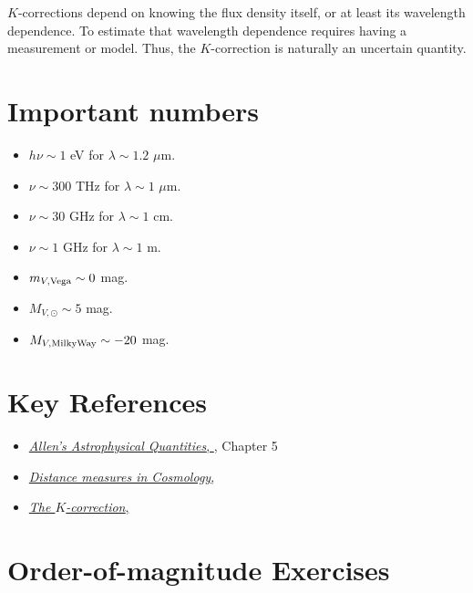 $K$-corrections depend on knowing the flux density itself, or at least
its wavelength dependence. To estimate that wavelength dependence
requires having a measurement or model. Thus, the $K$-correction is
naturally an uncertain quantity.

\section{Important numbers}

\begin{itemize}
\item $h\nu \sim 1$ eV for $\lambda \sim 1.2$ $\mu$m.
\item $\nu \sim 300$ THz for $\lambda \sim 1$ $\mu$m.
\item $\nu \sim 30$ GHz for $\lambda \sim 1$ cm.
\item $\nu \sim 1$ GHz for $\lambda \sim 1$ m.
\item $m_{V, {\rm Vega}} \sim 0$ mag.
\item $M_{V, \odot} \sim 5$ mag.
\item $M_{V, {\rm Milky Way}} \sim -20$ mag.
\end{itemize}

\section{Key References}

\begin{itemize}
  \item
    \href{http://adsabs.harvard.edu/abs/2000asqu.book.....C}{
    {\it Allen's Astrophysical Quantities},
      \citet{cox00a}}, Chapter 5
  \item
    \href{http://adsabs.harvard.edu/abs/1999astro.ph..5116H}{
    {\it Distance measures in Cosmology},
      \citet{hogg99cosm}}
  \item
    \href{http://adsabs.harvard.edu/abs/2002astro.ph.10394H}{
    {\it The $K$-correction},
      \citet{hogg02c}}
\end{itemize}

\section{Order-of-magnitude Exercises}


